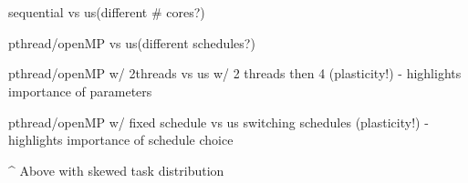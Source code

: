 \section{}

sequential vs us(different # cores?)

pthread/openMP vs us(different schedules?)

pthread/openMP w/ 2threads vs us w/ 2 threads then 4 (plasticity!)       - highlights importance of parameters

pthread/openMP w/ fixed schedule vs us switching schedules (plasticity!) - highlights importance of schedule choice

^ Above with skewed task distribution